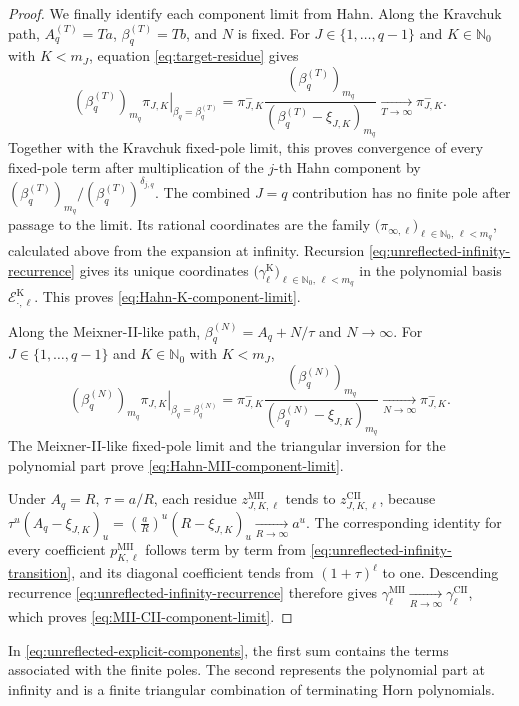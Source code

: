 \documentclass[10pt]{amsart}
\newcommand{\Nzero}{\mathbb N_0}
\theoremstyle{plain}
\theoremstyle{definition}
\theoremstyle{remark}
\begin{document}
\begin{proof}
We finally identify each component limit from Hahn. Along the
Kravchuk path, \(A_q^{(T)}=Ta\), \(\beta_q^{(T)}=Tb\), and \(N\) is fixed.
For \(J\in\{1,\ldots,q-1\}\) and \(K\in\Nzero\) with \(K<m_J\),
equation \eqref{eq:target-residue} gives
\[
 (\beta_q^{(T)})_{m_q}
 \left.\pi_{J,K}\right|_{\beta_q=\beta_q^{(T)}}
 =\pi_{J,K}^{-}
 \frac{(\beta_q^{(T)})_{m_q}}
      {(\beta_q^{(T)}-\xi_{J,K})_{m_q}}
 \xrightarrow[T\to\infty]{}\pi_{J,K}^{-}.
\]
Together with the Kravchuk fixed-pole limit, this proves convergence of
every fixed-pole term after multiplication of the \(j\)-th Hahn component
by \((\beta_q^{(T)})_{m_q}/
(\beta_q^{(T)})^{\delta_{j,q}}\).
The combined \(J=q\) contribution has no finite pole after passage to the
limit. Its rational coordinates are the family
\(\bigl(\pi_{\infty,\ell}\bigr)_{\ell\in\Nzero,\,\ell<m_q}\), calculated
above from the expansion at infinity. Recursion
\eqref{eq:unreflected-infinity-recurrence} gives its unique coordinates
\(\bigl(\gamma_\ell^{\mathrm K}\bigr)_{\ell\in\Nzero,\,\ell<m_q}\) in the
polynomial basis \(\mathcal E_{\cdot,\ell}^{\mathrm K}\). This proves
\eqref{eq:Hahn-K-component-limit}.

Along the Meixner-II-like path,
\(\beta_q^{(N)}=A_q+N/\tau\) and \(N\to\infty\).
For \(J\in\{1,\ldots,q-1\}\) and \(K\in\Nzero\) with \(K<m_J\),
\[
 (\beta_q^{(N)})_{m_q}
 \left.\pi_{J,K}\right|_{\beta_q=\beta_q^{(N)}}
 =\pi_{J,K}^{-}
 \frac{(\beta_q^{(N)})_{m_q}}
      {(\beta_q^{(N)}-\xi_{J,K})_{m_q}}
 \xrightarrow[N\to\infty]{}\pi_{J,K}^{-}.
\]
The Meixner-II-like fixed-pole limit and the triangular inversion for the
polynomial part prove \eqref{eq:Hahn-MII-component-limit}.

Under \(A_q=R\), \(\tau=a/R\), each residue
\(z_{J,K,\ell}^{\mathrm{MII}}\) tends to
\(z_{J,K,\ell}^{\mathrm{CII}}\), because
\(\tau^u(A_q-\xi_{J,K})_u
=\left(\frac aR\right)^u(R-\xi_{J,K})_u
 \xrightarrow[R\to\infty]{}a^u\).
The corresponding identity for every coefficient
\(p_{K,\ell}^{\mathrm{MII}}\) follows term by term from
\eqref{eq:unreflected-infinity-transition}, and its diagonal coefficient tends
from \((1+\tau)^\ell\) to one. Descending recurrence
\eqref{eq:unreflected-infinity-recurrence} therefore
gives \(\gamma_\ell^{\mathrm{MII}}\xrightarrow[R\to\infty]{}
\gamma_\ell^{\mathrm{CII}}\), which proves
\eqref{eq:MII-CII-component-limit}.
\end{proof}

In \eqref{eq:unreflected-explicit-components}, the first sum contains the
terms associated with the finite poles. The second represents the
polynomial part at infinity and is a finite triangular combination of
terminating Horn polynomials.
\end{document}
